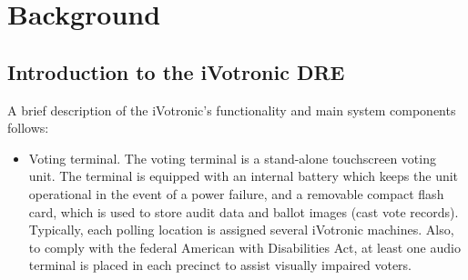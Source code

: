 \section{Background}

\subsection{Introduction to the iVotronic DRE}
A brief description of the iVotronic’s functionality and main system components follows:

\begin{itemize} 
\item Voting terminal. The voting terminal is a stand-alone touchscreen voting unit.  The terminal is equipped with an internal battery which keeps the unit operational in the event of a power failure, and a removable compact flash card, which is used to store audit data and ballot images (cast vote records). Typically, each polling location is assigned several iVotronic machines. Also, to comply with the federal American with Disabilities Act, at least one audio terminal is placed in each precinct to assist visually impaired voters.


\end{itemize}
